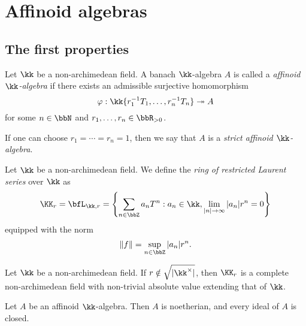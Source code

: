\section{Affinoid algebras}

\subsection{The first properties}

    \begin{definition}\label{def:affinoid_algebras}
        Let \(\kk\) be a non-archimedean field. 
        A banach \(\kk\)-algebra \(A\) is called a \emph{ affinoid \(\kk\)-algebra} if there exists an admissible surjective homomorphism
        \[
            \varphi: \kk\{ r_1^{-1} T_1, \ldots, r_n^{-1} T_n \} \twoheadrightarrow A
        \]
        for some \(n \in \bbN\) and \(r_1, \ldots, r_n \in \bbR_{>0}\).

        If one can choose \(r_1 = \cdots = r_n = 1\), then we say that \(A\) is a \emph{strict affinoid \(\kk\)-algebra}.
    \end{definition}

    \begin{definition}\label{def:restricted_Laurent_series}
        Let \(\kk\) be a non-archimedean field.
        We define the \emph{ring of restricted Laurent series} over \(\kk\) as 
        \[ \KK_r = \bfL_{\kk,r} = \left\{\sum_{n \in \bbZ} a_n T^n : a_n \in \kk, \lim_{|n| \to \infty} |a_n| r^n = 0 \right\} \]
        equipped with the norm
        \[ \|f\| = \sup_{n \in \bbZ} |a_n| r^n. \]
    \end{definition}


    \begin{proposition}\label{prop:restricted_Laurent_series_is_a_field_when_r_is_not_root_of_absolute_value}
        Let \(\kk\) be a non-archimedean field.
        If \(r \notin \sqrt{|\kk^\times|}\), then \(\KK_r\) is a complete non-archimedean field with non-trivial absolute value extending that of \(\kk\).
    \end{proposition}

    \begin{proposition}\label{prop:affinoid_algebra_is_noetherian_and_ideal_is_clsoed}
        Let \(A\) be an affinoid \(\kk\)-algebra.
        Then \(A\) is noetherian, and every ideal of \(A\) is closed.
    \end{proposition}


